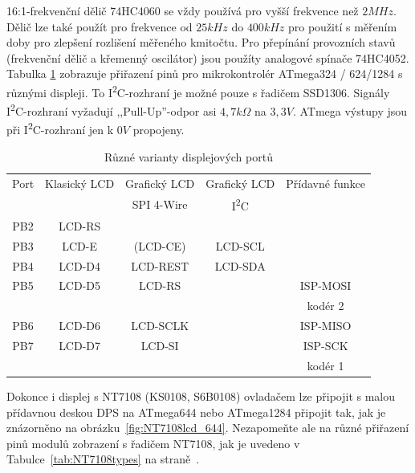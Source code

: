 16:1-frekvenční dělič 74HC4060 se vždy používá pro vyšší frekvence než \(2MHz\).
Dělič lze také použít pro frekvence od \(25kHz\) do \(400kHz\) pro použití s měřením doby pro zlepšení rozlišení měřeného kmitočtu.
Pro přepínání provozních stavů (frekvenční dělič a křemenný oscilátor) jsou
použíty analogové spínače 74HC4052.
Tabulka \ref{tab:mega644-display} zobrazuje přiřazení pinů pro mikrokontrolér ATmega324 / 624/1284 s různými displeji.
To I\textsuperscript{2}C-rozhraní je možné pouze s řadičem SSD1306.
Signály I\textsuperscript{2}C-rozhraní vyžadují ,,Pull-Up''-odpor asi \(4,7k\Omega\) na \(3,3V\).
ATmega výstupy jsou při I\textsuperscript{2}C-rozhraní jen k \(0V\) propojeny.
\begin{table}[H]
  \begin{center}
    \begin{tabular}{| c || c | c | c | c |}
    \hline
      Port & Klasický LCD &  Grafický LCD & Grafický LCD  & Přídavné funkce      \\
           &               &  SPI 4-Wire  &  I\textsuperscript{2}C         &                     \\
    \hline
    \hline
    PB2    &  LCD-RS         &            &             &       \\
    \hline
    PB3    &  LCD-E          & (LCD-CE)   &  LCD-SCL    &       \\
    \hline
    PB4    &  LCD-D4         & LCD-REST   &  LCD-SDA    &       \\
    \hline
    PB5    &  LCD-D5         & LCD-RS     &             & ISP-MOSI \\
           &                 &            &             & kodér 2 \\
    \hline
    PB6    &  LCD-D6         & LCD-SCLK   &             & ISP-MISO \\
    \hline
    PB7    &  LCD-D7         & LCD-SI     &             & ISP-SCK  \\
           &                 &            &             & kodér 1 \\
    \hline
    \end{tabular}
  \end{center}
  \vspace{-0.3cm}
  \caption{Různé varianty displejových portů}
  \label{tab:mega644-display}
\end{table}

Dokonce i displej s NT7108 (KS0108, S6B0108) ovladačem lze připojit s malou přídavnou deskou DPS na
ATmega644 nebo ATmega1284 připojit tak, jak je znázorněno na obrázku~\ref{fig:NT7108lcd_644}.
Nezapomeňte ale na různé přiřazení pinů modulů zobrazení s řadičem NT7108, jak je uvedeno v
Tabulce~\ref{tab:NT7108types} na straně~\pageref{tab:NT7108types}.

